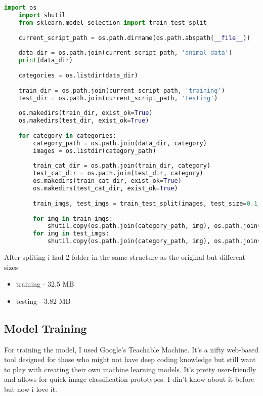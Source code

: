 \begin{lstlisting}[language=Python]
    import os
    import shutil
    from sklearn.model_selection import train_test_split
    
    current_script_path = os.path.dirname(os.path.abspath(__file__))
    
    data_dir = os.path.join(current_script_path, 'animal_data')
    print(data_dir)
    
    categories = os.listdir(data_dir)
    
    train_dir = os.path.join(current_script_path, 'training')
    test_dir = os.path.join(current_script_path, 'testing')
    
    os.makedirs(train_dir, exist_ok=True)
    os.makedirs(test_dir, exist_ok=True)
    
    for category in categories:
        category_path = os.path.join(data_dir, category)
        images = os.listdir(category_path)
        
        train_cat_dir = os.path.join(train_dir, category)
        test_cat_dir = os.path.join(test_dir, category)
        os.makedirs(train_cat_dir, exist_ok=True)
        os.makedirs(test_cat_dir, exist_ok=True)
        
        train_imgs, test_imgs = train_test_split(images, test_size=0.1, random_state=42)
      
        for img in train_imgs:
            shutil.copy(os.path.join(category_path, img), os.path.join(train_cat_dir, img))
        for img in test_imgs:
            shutil.copy(os.path.join(category_path, img), os.path.join(test_cat_dir, img))    
\end{lstlisting}

After spliting i had 2 folder in the same structure as the original but different sizes
\begin{itemize}
    \item training -  32.5 MB
    \item testing - 3.82 MB
\end{itemize}


\subsection{Model Training}
For training the model, I used Google's Teachable Machine. It's a nifty web-based tool designed for those who might not have deep coding knowledge but still want to play with creating their own machine learning models. It's pretty user-friendly and allows for quick image classification prototypes. I din't know about it before but now i love it.

